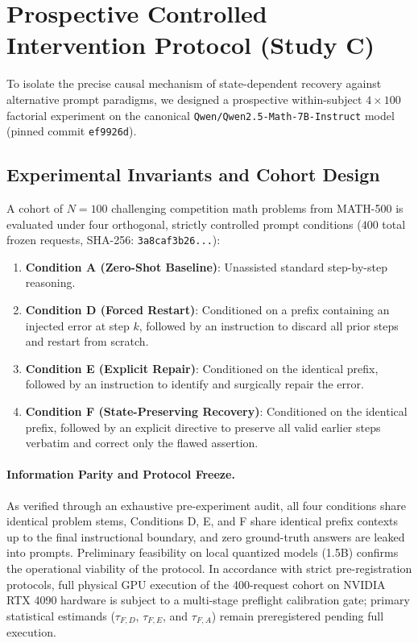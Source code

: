 \documentclass[11pt]{article}
\begin{document}
\section{Prospective Controlled Intervention Protocol (Study C)}

To isolate the precise causal mechanism of state-dependent recovery against alternative prompt paradigms, we designed a prospective within-subject $4 \times 100$ factorial experiment on the canonical \texttt{Qwen/Qwen2.5-Math-7B-Instruct} model (pinned commit \texttt{ef9926d}).

\subsection{Experimental Invariants and Cohort Design}
A cohort of $N=100$ challenging competition math problems from MATH-500 is evaluated under four orthogonal, strictly controlled prompt conditions ($400$ total frozen requests, SHA-256: \texttt{3a8caf3b26...}):
\begin{enumerate}
    \item \textbf{Condition A (Zero-Shot Baseline)}: Unassisted standard step-by-step reasoning.
    \item \textbf{Condition D (Forced Restart)}: Conditioned on a prefix containing an injected error at step $k$, followed by an instruction to discard all prior steps and restart from scratch.
    \item \textbf{Condition E (Explicit Repair)}: Conditioned on the identical prefix, followed by an instruction to identify and surgically repair the error.
    \item \textbf{Condition F (State-Preserving Recovery)}: Conditioned on the identical prefix, followed by an explicit directive to preserve all valid earlier steps verbatim and correct only the flawed assertion.
\end{enumerate}

\paragraph{Information Parity and Protocol Freeze.}
As verified through an exhaustive pre-experiment audit, all four conditions share identical problem stems, Conditions D, E, and F share identical prefix contexts up to the final instructional boundary, and zero ground-truth answers are leaked into prompts. Preliminary feasibility on local quantized models (1.5B) confirms the operational viability of the protocol. In accordance with strict pre-registration protocols, full physical GPU execution of the 400-request cohort on NVIDIA RTX 4090 hardware is subject to a multi-stage preflight calibration gate; primary statistical estimands ($\tau_{F, D}$, $\tau_{F, E}$, and $\tau_{F, A}$) remain preregistered pending full execution.
\end{document}
